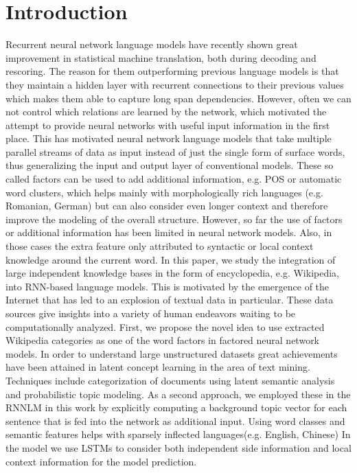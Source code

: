 \documentclass[a4paper]{article}
\begin{document}
\section{Introduction}
Recurrent neural network language models have recently shown great improvement in statistical machine translation, both during decoding and rescoring. The reason for them outperforming previous language models is that they maintain a hidden layer with recurrent connections to their previous values which makes them able to capture long span dependencies. However, often we can not control which relations are learned by the network, which motivated the attempt to provide neural networks with useful input information in the first place. This has motivated neural network language models that take multiple parallel streams of data as input instead of just the single form of surface words, thus generalizing the input and output layer of conventional models. These so called factors can be used to add additional information, e.g. POS or automatic word clusters, which helps mainly with morphologically rich languages (e.g. Romanian, German) but can also consider even longer context and therefore improve the modeling of the overall structure.
However, so far the use of factors or additional information has been limited in neural network models. Also, in those cases the extra feature only attributed to syntactic or local context knowledge around the current word. 
In this paper, we study the integration of large independent knowledge bases in the form of encyclopedia, e.g. Wikipedia, into RNN-based language models. This is motivated by the emergence of the Internet that has led to an explosion of textual data in particular. These data sources give insights into a variety of human endeavors waiting to be computationally analyzed.
First, we propose the novel idea to use extracted Wikipedia categories as one of the word factors in factored neural network models. In order to understand large unstructured datasets great achievements have been attained in latent concept learning in the area of text mining. Techniques include categorization of documents using latent semantic analysis and probabilistic topic modeling. As a second approach, we employed these in the RNNLM in this work by explicitly computing a background topic vector for each sentence that is fed into the network as additional input. Using word classes and semantic features helps with sparsely inflected languages(e.g. English, Chinese) \cite{bilmes2003factored}
In the model we use LSTMs to consider both independent side information and local context information for the model prediction.
\end{document}
